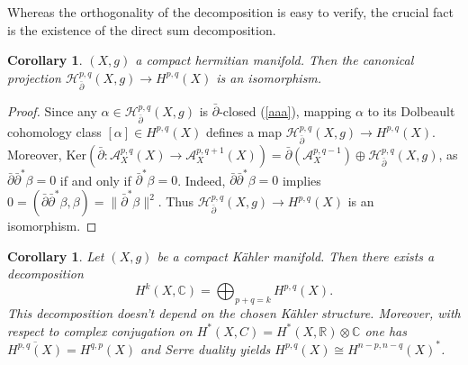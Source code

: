 \documentclass{article}
\theoremstyle{definition}
\theoremstyle{plain}
\newtheorem{corollary}[definition]{Corollary}
\begin{document}
Whereas the orthogonality of the decomposition is easy to verify, the crucial fact is the existence of the direct sum decomposition.

\begin{corollary}
    $ (X,g) $ a compact hermitian manifold. Then the canonical projection $ \mathcal{H}^{p,q}_{\bar{\partial}}(X,g)\rightarrow H^{p,q}(X) $ is an isomorphism.
\end{corollary}

\begin{proof}
    Since any $ \alpha\in\mathcal{H}^{p,q}_{\bar{\partial}}(X,g) $ is $ \bar{\partial} $-closed (\ref{aaa}), mapping $ \alpha $ to its Dolbeault cohomology class $ [\alpha]\in H^{p,q}(X) $ defines a map $ \mathcal{H}^{p,q}_{\bar{\partial}}(X,g)\rightarrow H^{p,q}(X) $. Moreover, $ \mathrm{Ker}(\bar{\partial}:\mathcal{A}^{p,q}_{X}(X)\rightarrow\mathcal{A}^{p,q+1}_{X}(X))=\bar{\partial}(\mathcal{A}^{p,q-1}_{X})\oplus\mathcal{H}^{p,q}_{\bar{\partial}}(X,g) $, as $ \bar{\partial}\bar{\partial}^*\beta=0 $ if and only if $ \bar{\partial}^*\beta=0 $. Indeed, $ \bar{\partial}\bar{\partial}^*\beta=0 $ implies $ 0=(\bar{\partial}\bar{\partial}^*\beta,\beta)=\|\bar{\partial}^*\beta\|^2 $. Thus $ \mathcal{H}^{p,q}_{\bar{\partial}}(X,g)\rightarrow H^{p,q}(X) $ is an isomorphism.
\end{proof}

\begin{corollary}
    Let $ (X,g) $ be a compact K\"{a}hler manifold. Then there exists a decomposition\[
        H^k(X,\mathbb{C})=\bigoplus_{p+q=k}H^{p,q}(X).
    \]This decomposition doesn't depend on the chosen K\"{a}hler structure.
    Moreover, with respect to complex conjugation on $ H^*(X,C)=H^*(X,\mathbb{R})\otimes\mathbb{C} $ one has $ \overline{H^{p,q}(X)}=H^{q,p}(X) $ and Serre duality yields $ H^{p,q}(X)\cong H^{n-p,n-q}(X)^* $.
\end{corollary}
\end{document}
